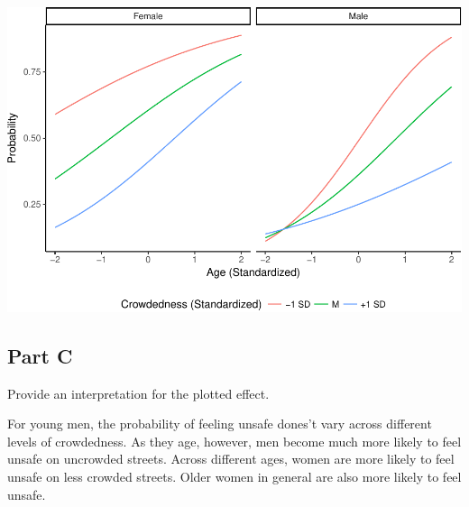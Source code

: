 \documentclass[]{article}
\begin{document}
\includegraphics{Beck_HW_11_files/figure-latex/unnamed-chunk-20-1.pdf}

\subsection{Part C}\label{part-c-1}

Provide an interpretation for the plotted effect.

For young men, the probability of feeling unsafe dones't vary across
different levels of crowdedness. As they age, however, men become much
more likely to feel unsafe on uncrowded streets. Across different ages,
women are more likely to feel unsafe on less crowded streets. Older
women in general are also more likely to feel unsafe.
\end{document}
